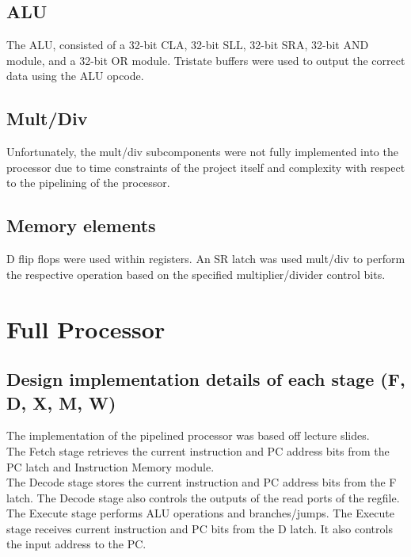 \documentclass[a4paper,11pt]{article}
\begin{document}
\subsection*{ALU}
The ALU, consisted of a 32-bit CLA, 32-bit SLL, 32-bit SRA, 32-bit AND module, and a 32-bit OR module. Tristate buffers were used to output the correct data using the ALU opcode. 

\subsection*{Mult/Div}

Unfortunately, the mult/div subcomponents were not fully implemented into the processor due to time constraints of the project itself and complexity with respect to the pipelining of the processor.

\subsection*{Memory elements}

D flip flops were used within registers. An SR latch was used mult/div to perform the respective operation based on the specified multiplier/divider control bits.

\newpage

\section{Full Processor}
\setlength{\parindent}{0cm}
\subsection*{Design implementation details of each stage (F, D, X, M, W)}

The implementation of the pipelined processor was based off lecture slides. \\

The Fetch stage retrieves the current instruction and PC address bits from the PC latch and Instruction Memory module. \\

The Decode stage stores the current instruction and PC address bits from the F latch. The Decode stage also controls the outputs of the read ports of the regfile. \\

The Execute stage performs ALU operations and branches/jumps. The Execute stage receives current instruction and PC bits from the D latch. It also controls the input address to the PC. \\
\end{document}
